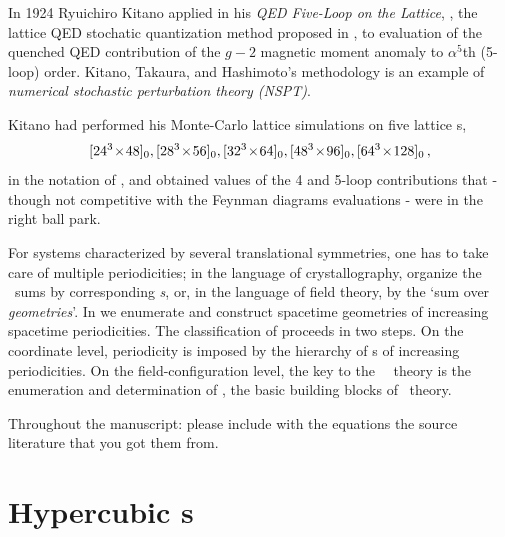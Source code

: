 \documentclass[11pt,a4paper]{article}
\begin{document}
In 1924 Ryuichiro Kitano 
applied in his
{\em QED Five-Loop on the Lattice},
,
the lattice QED stochatic quantization method 
proposed in 
, 
to evaluation of the quenched QED contribution of the {$g-2$} magnetic moment anomaly
to $\alpha^5$th (5-loop) order.
Kitano, Takaura, and Hashimoto's  methodology is an example of
{\em numerical stochastic perturbation theory (NSPT)}.

Kitano had performed his Monte-Carlo lattice simulations on five lattice 
 {\pcell}s,
\[
\BravCell{24^3}{48}{0}, 
\BravCell{28^3}{56}{0}, 
\BravCell{32^3}{64}{0}, 
\BravCell{48^3}{96}{0},
\BravCell{64^3}{128}{0}
\,, 
\]
in the notation of ,
and obtained values of the 4 and 5-loop contributions 
that - though not competitive with the Feynman diagrams evaluations - were
in the right ball park.


For systems 
characterized by several translational symmetries, one has to take care 
of multiple periodicities; in the language of crystallography,  organize 
	the \po\ sums by corresponding {\em {\Blatt}s}, or, in the language of 
field theory, by the `sum over \emph{geometries}'. In  
we enumerate and construct spacetime geometries
of increasing spacetime periodicities. The classification 
of {\lsts} proceeds in two steps. On the coordinate level, periodicity is 
imposed by the hierarchy of {\Blatt}s of increasing periodicities. 
On the field-configuration level, the key to the \spt\ \po\ theory is the 
enumeration and  determination of \emph{\primeOrbs}, the basic building 
blocks of \po\ theory.

{Throughout the manuscript: please include with the equations the source literature that you got them from.}


\section{Hypercubic {\Blatt}s}
\label{s:Blatts} 
\end{document}
